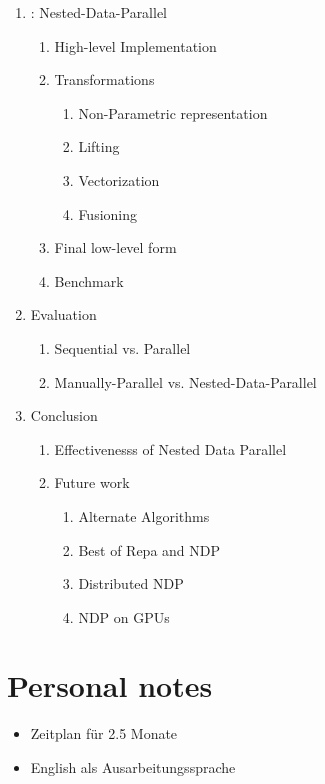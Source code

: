 \documentclass{article}
\begin{document}
\begin{enumerate}
        \item   : Nested-Data-Parallel
            \begin{enumerate}
            \item High-level Implementation
            \item Transformations
                \begin{enumerate}
                \item Non-Parametric representation
                \item Lifting
                \item Vectorization
                \item Fusioning
                \end{enumerate}
            \item Final low-level form

            \item Benchmark
            \end{enumerate}

        \item Evaluation
            \begin{enumerate}
            \item Sequential vs. Parallel
            \item Manually-Parallel vs. Nested-Data-Parallel
            \end{enumerate}

        \item Conclusion
            \begin{enumerate}
            \item Effectivenesss of Nested Data Parallel

            \item Future work
                \begin{enumerate}
                    \item Alternate Algorithms
                    \item Best of Repa and NDP
                    \item Distributed NDP
                    \item NDP on GPUs
                \end{enumerate}
            \end{enumerate}
        \end{enumerate}

    \newpage


    \newpage

    \section{Personal notes}

    \begin{itemize}
        \item Zeitplan für 2.5 Monate
        \item English als Ausarbeitungssprache
    \end{itemize}
\end{document}
